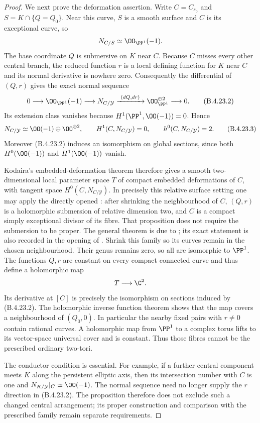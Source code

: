 \begin{proof}
We next prove the deformation assertion. Write
$C=C_{s_0}$ and $S=K\cap\{Q=Q_0\}$. Near this curve,
$S$ is a smooth surface and $C$ is its exceptional curve,
so
\[
 N_{C/S}\simeq\OO_{\PP^1}(-1).
\]
The base coordinate $Q$ is submersive on $K$ near $C$.
Because $C$ misses every other central branch, the reduced
function $r$ is a local defining function for $K$ near
$C$ and its normal derivative is nowhere zero.
Consequently the differential of $(Q,r)$ gives the exact
normal sequence
\[
 0\longrightarrow\OO_{\PP^1}(-1)
 \longrightarrow N_{C/\mathcal Y}
 \xrightarrow{\ (dQ,dr)\ }
 \OO_{\PP^1}^{\oplus2}\longrightarrow0.
                                                        \tag{B.4.23.2}
\]
Its extension class vanishes because
$H^1(\PP^1,\OO(-1))=0$. Hence
\[
 N_{C/\mathcal Y}\simeq
 \OO(-1)\oplus\OO^{\oplus2},\qquad
 H^1(C,N_{C/\mathcal Y})=0,\qquad
 h^0(C,N_{C/\mathcal Y})=2.                             \tag{B.4.23.3}
\]
Moreover (B.4.23.2) induces an isomorphism on global
sections, since both $H^0(\OO(-1))$ and $H^1(\OO(-1))$
vanish.

Kodaira's embedded-deformation theorem therefore gives a
smooth two-dimensional local parameter space $T$ of
compact embedded deformations of $C$, with tangent space
$H^0(C,N_{C/\mathcal Y})$. In precisely this relative
surface setting one may apply the directly opened
\citet[Proposition 2.3 and its proof, pp.~6--7 of the
original preprint]{DlousskyTeleman2012AB}: after shrinking
the neighbourhood of $C$, $(Q,r)$ is a holomorphic
submersion of relative dimension two, and $C$ is a
compact simply exceptional divisor of its fibre.
That proposition does not require the submersion to be
proper. The general theorem is due to
\citet{Kodaira1962D}; its exact statement is also recorded
in the opening of \citet{Merkulov1995D}.
Shrink this family so its curves
remain in the chosen neighbourhood. Their genus remains
zero, so all are isomorphic to $\PP^1$.
The functions $Q,r$ are constant on every compact
connected curve and thus define a holomorphic map
\[
 T\longrightarrow\C^2.
\]
Its derivative at $[C]$ is precisely the isomorphism on
sections induced by (B.4.23.2). The holomorphic inverse
function theorem shows that the map covers a neighbourhood
of $(Q_0,0)$. In particular the nearby fixed pairs with
$r\ne0$ contain rational curves. A holomorphic map from
$\PP^1$ to a complex torus lifts to its vector-space
universal cover and is constant. Thus those fibres cannot
be the prescribed ordinary two-tori.

The conductor condition is essential. For example, if a
further central component meets $K$ along the persistent
elliptic axis, then its intersection number with $C$ is
one and $N_{K/\mathcal Y}|_C\simeq\OO(-1)$.
The normal sequence need no longer supply the $r$ direction
in (B.4.23.2). The proposition therefore does not exclude
such a changed central arrangement; its proper construction
and comparison with the prescribed family remain separate
requirements.
\end{proof}

